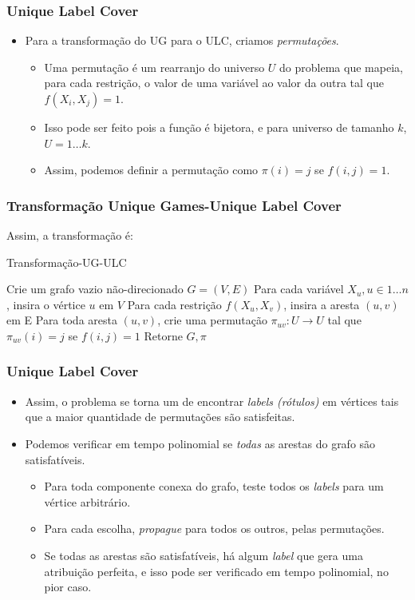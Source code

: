 \documentclass[11pt, handout]{beamer}
\newcommand{\Algoritmo}[1]{{\color{coralertedfg}#1}}
\begin{document}
\begin{frame}[<+->]
    \frametitle{Unique Label Cover}
    \begin{itemize}
        \item Para a transformação do UG para o ULC, criamos \emph{permutações}.
        \begin{itemize}
            \item Uma permutação é um rearranjo do universo $U$ do problema que mapeia, para cada restrição, o valor de uma variável ao valor da outra tal que $f(X_i,X_j) = 1$.
            \item Isso pode ser feito pois a função é bijetora, e para universo de tamanho $k$, $U={1\dots k}$.
            \item Assim, podemos definir a permutação como $\pi(i) = j$ se $f(i,j) = 1$.
        \end{itemize}
    \end{itemize}
\end{frame}

\begin{frame}
    \frametitle{Transformação Unique Games-Unique Label Cover}
    Assim, a transformação é:
    \begin{block}{\Algoritmo{Transformação-UG-ULC}}
        \begin{algorithm}[H]
          Crie um grafo vazio não-direcionado $G=(V,E)$\;
          Para cada variável $X_u, u \in {1\dots n}$, insira o vértice $u$ em $V$\;
          \pause
          Para cada restrição $f(X_u,X_v)$, insira a aresta $(u,v)$ em E\;
          \pause
          Para toda aresta $(u,v)$, crie uma permutação $\pi_{uv}: U \xrightarrow{} U$ tal que $\pi_{uv}(i)=j$ se $f(i,j)=1$\;
          \pause
          Retorne $G, \pi$\;
        \end{algorithm}
    \end{block}
\end{frame}

\begin{frame}[<+->]
    \frametitle{Unique Label Cover}
    \begin{itemize}
        \item Assim, o problema se torna um de encontrar \emph{labels (rótulos)} em vértices tais que a maior quantidade de permutações são satisfeitas.
        \item Podemos verificar em tempo polinomial se \emph{todas} as arestas do grafo são satisfatíveis.
        \begin{itemize}
            \item Para toda componente conexa do grafo, teste todos os \textit{labels} para um vértice arbitrário.
            \item Para cada escolha, \emph{propague} para todos os outros, pelas permutações.
            \item Se todas as arestas são satisfatíveis, há algum \textit{label} que gera uma atribuição perfeita, e isso pode ser verificado em tempo polinomial, no pior caso.
        \end{itemize}
    \end{itemize}
\end{frame}
\end{document}
